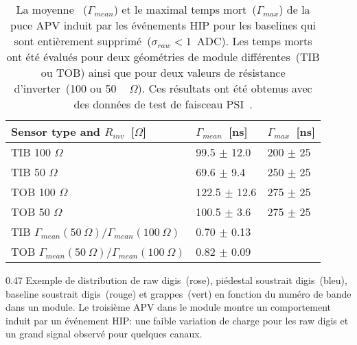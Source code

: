 \begin{table}[h]
\begin{center}
\begin{tabular}{|l|l|l|}
\hline
Sensor type and $R_{inv}$~[$\Omega$] & $\Gamma_{mean}$~[ns]  & $\Gamma_{max}$~[ns] \\
\hline
\hline
TIB 100 $\Omega$ & 99.5 $\pm$ 12.0 & 200 $\pm$ 25 \\
TIB 50  $\Omega$ & 69.6 $\pm$ 9.4 & 250 $\pm$ 25 \\
TOB 100  $\Omega$ & 122.5 $\pm$ 12.6 & 275 $\pm$ 25 \\
TOB 50 $\Omega$  & 100.5 $\pm$ 3.6 & 275 $\pm$ 25 \\
\hline
TIB $\Gamma_{mean}(50~\Omega )/\Gamma_{mean}(100~\Omega)$ &  0.70 $\pm$ 0.13  & \\
TOB $\Gamma_{mean}(50~\Omega )/\Gamma_{mean}(100~\Omega)$ &  0.82 $\pm$ 0.09 & \\
\hline
\end{tabular}
\caption[Table caption text]{La moyenne~ ($\Gamma_{mean} $) et le maximal temps mort~($\Gamma_{max}$) de la puce APV induit par les événements HIP pour les baselines qui sont entièrement supprimé~($\sigma_{raw} <1 $~ADC). Les temps morts ont été évalués pour deux géométries de module différentes~(TIB ou TOB) ainsi que pour deux valeurs de résistance d'inverter~(100 ou 50 ~ $\Omega$). Ces résultats ont été obtenus avec des données de test de faisceau PSI~\cite{Bainbridge: 2004jc}.}
\label{tab:tableDeadtimes2}
\end{center}
\end{table}


                 {0.47}
                 {Exemple de distribution de raw digis~(rose), piédestal soustrait digis~(bleu), baseline soustrait digis~(rouge) et grappes~(vert) en fonction du numéro de bande dans un module. Le troisième APV dans le module montre un comportement induit par un événement HIP: une faible variation de charge pour les raw digis et un grand signal observé pour quelques canaux.}       %

